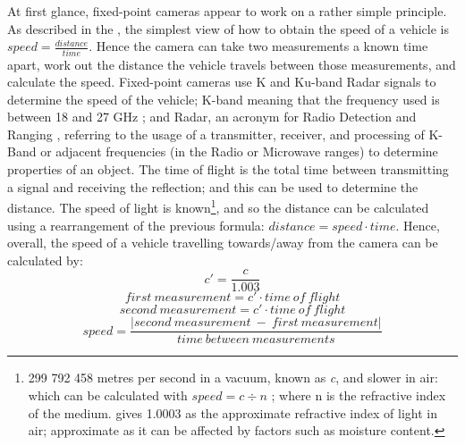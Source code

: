 \documentclass[11pt, a4paper, notitlepage]{report}
\begin{document}
At first glance, fixed-point cameras appear to work on a rather simple principle. As described in the , the simplest view of how to obtain the speed of a vehicle is $ speed = \frac{distance}{time} $. Hence the camera can take two measurements a known time apart, work out the distance the vehicle travels between those measurements, and calculate the speed. 
Fixed-point cameras use K and Ku-band Radar signals to determine the speed of the vehicle; K-band meaning that the frequency used is between 18 and 27 GHz \citep{IEEERadar}; and Radar, an acronym for Radio Detection and Ranging \citep{RadarNaming}, referring to the usage of a transmitter, receiver, and processing of K-Band or adjacent frequencies (in the Radio or Microwave ranges) to determine properties of an object. The time of flight is the total time between transmitting a signal and receiving the reflection; and this can be used to determine the distance. The speed of light is known\footnote{299 792 458 metres per second in a vacuum, known as \textit{c}, and slower in air: which can be calculated with $ speed = c \div n $ \citep{HechtOptics}; where n is the refractive index of the medium. \citet{refIndxAir} gives 1.0003 as the approximate refractive index of light in air; approximate as it can be affected by factors such as moisture content.}, and so the distance can be calculated using a rearrangement of the previous formula: $ distance = speed  \cdot time $. Hence, overall, the speed of a vehicle travelling towards/away from the camera can be calculated by:
\begin{equation}
	c' = \frac{c}{1.003}
\end{equation}
\begin{equation}
	first~measurement = c' \cdot time~of~flight
\end{equation}
\begin{equation}
	second~measurement = c' \cdot time~of~flight
\end{equation}
\begin{equation}
	speed = \frac{\left|second~measurement~-~first~measurement\right|}{time~between~measurements}
\end{equation}
\end{document}
